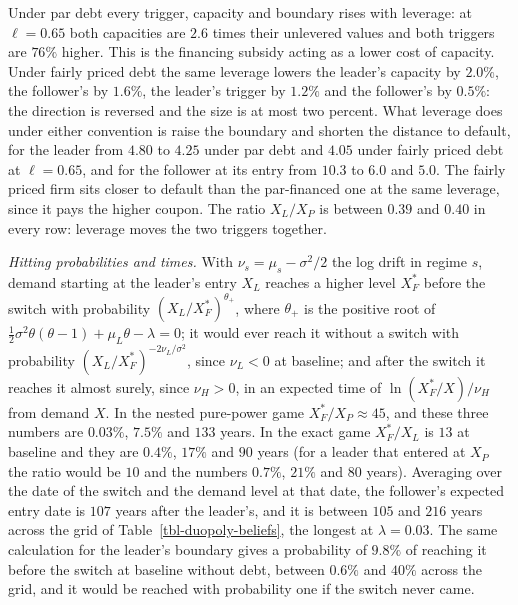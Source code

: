 \documentclass[
  11pt,
  letterpaper,
]{scrartcl}
\begin{document}
Under par debt every trigger, capacity and boundary rises with leverage:
at \(\ell = 0.65\) both capacities are \(2.6\) times their unlevered
values and both triggers are \(76\%\) higher. This is the financing
subsidy acting as a lower cost of capacity. Under fairly priced debt the
same leverage lowers the leader's capacity by \(2.0\%\), the follower's
by \(1.6\%\), the leader's trigger by \(1.2\%\) and the follower's by
\(0.5\%\): the direction is reversed and the size is at most two
percent. What leverage does under either convention is raise the
boundary and shorten the distance to default, for the leader from
\(4.80\) to \(4.25\) under par debt and \(4.05\) under fairly priced
debt at \(\ell = 0.65\), and for the follower at its entry from \(10.3\)
to \(6.0\) and \(5.0\). The fairly priced firm sits closer to default
than the par-financed one at the same leverage, since it pays the higher
coupon. The ratio \(X_L/X_P\) is between \(0.39\) and \(0.40\) in every
row: leverage moves the two triggers together.

\emph{Hitting probabilities and times.} With
\(\nu_s = \mu_s - \sigma^2/2\) the log drift in regime \(s\), demand
starting at the leader's entry \(X_L\) reaches a higher level \(X_F^*\)
before the switch with probability \((X_L/X_F^*)^{\theta_+}\), where
\(\theta_+\) is the positive root of
\(\tfrac{1}{2}\sigma^2\theta(\theta - 1) + \mu_L\theta - \lambda = 0\);
it would ever reach it without a switch with probability
\((X_L/X_F^*)^{-2\nu_L/\sigma^2}\), since \(\nu_L < 0\) at baseline; and
after the switch it reaches it almost surely, since \(\nu_H > 0\), in an
expected time of \(\ln(X_F^*/X)/\nu_H\) from demand \(X\). In the nested
pure-power game \(X_F^*/X_P \approx 45\), and these three numbers are
\(0.03\%\), \(7.5\%\) and \(133\) years. In the exact game \(X_F^*/X_L\)
is \(13\) at baseline and they are \(0.4\%\), \(17\%\) and \(90\) years
(for a leader that entered at \(X_P\) the ratio would be \(10\) and the
numbers \(0.7\%\), \(21\%\) and \(80\) years). Averaging over the date
of the switch and the demand level at that date, the follower's expected
entry date is \(107\) years after the leader's, and it is between
\(105\) and \(216\) years across the grid of
Table~\ref{tbl-duopoly-beliefs}, the longest at \(\lambda = 0.03\). The
same calculation for the leader's boundary gives a probability of
\(9.8\%\) of reaching it before the switch at baseline without debt,
between \(0.6\%\) and \(40\%\) across the grid, and it would be reached
with probability one if the switch never came.
\end{document}
